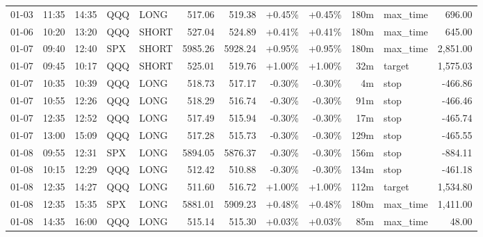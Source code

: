 \documentclass[11pt,a4paper,twoside]{article}
\begin{document}
\begin{center}
\begin{longtable}{>{\color{txtmain}}l l l l l r r r r r >{\color{txtmain}}l r}
01-03 & 11:35 & 14:35 & QQQ & LONG & 517.06 & 519.38 & \textcolor{wingreen}{+0.45\%} & \textcolor{wingreen}{+0.45\%} & 180m & max\_time & \textcolor{wingreen}{696.00} \\
01-06 & 10:20 & 13:20 & QQQ & SHORT & 527.04 & 524.89 & \textcolor{wingreen}{+0.41\%} & \textcolor{wingreen}{+0.41\%} & 180m & max\_time & \textcolor{wingreen}{645.00} \\
01-07 & 09:40 & 12:40 & SPX & SHORT & 5985.26 & 5928.24 & \textcolor{wingreen}{+0.95\%} & \textcolor{wingreen}{+0.95\%} & 180m & max\_time & \textcolor{wingreen}{2,851.00} \\
01-07 & 09:45 & 10:17 & QQQ & SHORT & 525.01 & 519.76 & \textcolor{wingreen}{+1.00\%} & \textcolor{wingreen}{+1.00\%} & 32m & target & \textcolor{wingreen}{1,575.03} \\
01-07 & 10:35 & 10:39 & QQQ & LONG & 518.73 & 517.17 & \textcolor{lossred}{-0.30\%} & \textcolor{lossred}{-0.30\%} & 4m & stop & \textcolor{lossred}{-466.86} \\
01-07 & 10:55 & 12:26 & QQQ & LONG & 518.29 & 516.74 & \textcolor{lossred}{-0.30\%} & \textcolor{lossred}{-0.30\%} & 91m & stop & \textcolor{lossred}{-466.46} \\
01-07 & 12:35 & 12:52 & QQQ & LONG & 517.49 & 515.94 & \textcolor{lossred}{-0.30\%} & \textcolor{lossred}{-0.30\%} & 17m & stop & \textcolor{lossred}{-465.74} \\
01-07 & 13:00 & 15:09 & QQQ & LONG & 517.28 & 515.73 & \textcolor{lossred}{-0.30\%} & \textcolor{lossred}{-0.30\%} & 129m & stop & \textcolor{lossred}{-465.55} \\
01-08 & 09:55 & 12:31 & SPX & LONG & 5894.05 & 5876.37 & \textcolor{lossred}{-0.30\%} & \textcolor{lossred}{-0.30\%} & 156m & stop & \textcolor{lossred}{-884.11} \\
01-08 & 10:15 & 12:29 & QQQ & LONG & 512.42 & 510.88 & \textcolor{lossred}{-0.30\%} & \textcolor{lossred}{-0.30\%} & 134m & stop & \textcolor{lossred}{-461.18} \\
01-08 & 12:35 & 14:27 & QQQ & LONG & 511.60 & 516.72 & \textcolor{wingreen}{+1.00\%} & \textcolor{wingreen}{+1.00\%} & 112m & target & \textcolor{wingreen}{1,534.80} \\
01-08 & 12:35 & 15:35 & SPX & LONG & 5881.01 & 5909.23 & \textcolor{wingreen}{+0.48\%} & \textcolor{wingreen}{+0.48\%} & 180m & max\_time & \textcolor{wingreen}{1,411.00} \\
01-08 & 14:35 & 16:00 & QQQ & LONG & 515.14 & 515.30 & \textcolor{wingreen}{+0.03\%} & \textcolor{wingreen}{+0.03\%} & 85m & max\_time & \textcolor{wingreen}{48.00} \\

\end{longtable}
\end{center}
\end{document}
